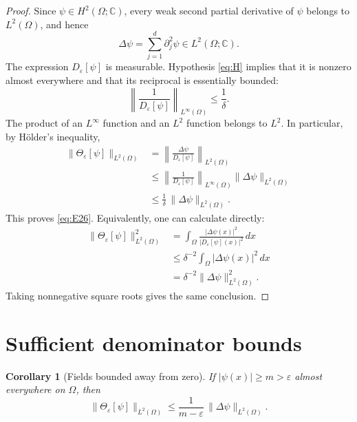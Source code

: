 \documentclass[11pt]{article}
\newtheorem{corollary}{Corollary}
\theoremstyle{remark}
\begin{document}
\begin{proof}
Since $\psi\in H^2(\Omega;\mathbb C)$, every weak second partial
derivative of $\psi$ belongs to $L^2(\Omega)$, and hence
\[
\Delta\psi=\sum_{j=1}^{d}\partial_j^2\psi
\in L^2(\Omega;\mathbb C).
\]
The expression $D_\varepsilon[\psi]$ is measurable. Hypothesis
\eqref{eq:H} implies that it is nonzero almost everywhere and that
its reciprocal is essentially bounded:
\begin{equation}\label{eq:reciprocal}
\left\|\frac{1}{D_\varepsilon[\psi]}\right\|_{L^\infty(\Omega)}
\leq\frac{1}{\delta}.
\end{equation}
The product of an $L^\infty$ function and an $L^2$ function belongs
to $L^2$. In particular, by H\"older's inequality,
\begin{align*}
\bigl\|\Theta_\varepsilon[\psi]\bigr\|_{L^2(\Omega)}
&=\left\|\frac{\Delta\psi}{D_\varepsilon[\psi]}
\right\|_{L^2(\Omega)}\\
&\leq\left\|\frac{1}{D_\varepsilon[\psi]}
\right\|_{L^\infty(\Omega)}
\bigl\|\Delta\psi\bigr\|_{L^2(\Omega)}\\
&\leq\frac{1}{\delta}\,
\bigl\|\Delta\psi\bigr\|_{L^2(\Omega)}.
\end{align*}
This proves \eqref{eq:E26}. Equivalently, one can calculate directly:
\begin{align*}
\bigl\|\Theta_\varepsilon[\psi]\bigr\|_{L^2(\Omega)}^2
&=\int_\Omega
\frac{|\Delta\psi(x)|^2}{|D_\varepsilon[\psi](x)|^2}\,dx\\
&\leq\delta^{-2}\int_\Omega|\Delta\psi(x)|^2\,dx\\
&=\delta^{-2}\bigl\|\Delta\psi\bigr\|_{L^2(\Omega)}^2.
\end{align*}
Taking nonnegative square roots gives the same conclusion.
\end{proof}

\section{Sufficient denominator bounds}

\begin{corollary}[Fields bounded away from zero]\label{cor:modulus}
If $|\psi(x)|\geq m>\varepsilon$ almost everywhere on $\Omega$, then
\begin{equation}\label{eq:modulus}
\bigl\|\Theta_\varepsilon[\psi]\bigr\|_{L^2(\Omega)}
\leq\frac{1}{m-\varepsilon}\,
\bigl\|\Delta\psi\bigr\|_{L^2(\Omega)}.
\end{equation}
\end{corollary}
\end{document}
